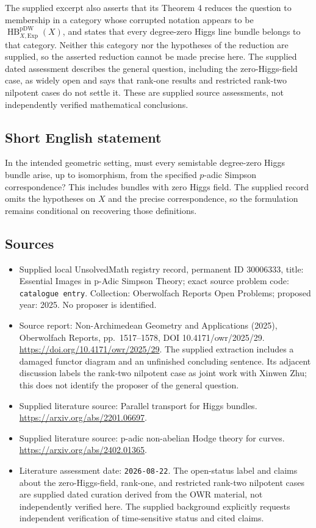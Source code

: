 \documentclass[11pt]{article}
\begin{document}
The supplied excerpt also asserts that its Theorem 4 reduces the question to membership in a category whose corrupted notation appears to be \(\operatorname{HB}^{\mathrm{pDW}}_{X,\mathrm{Exp}}(X)\), and states that every degree-zero Higgs line bundle belongs to that category. Neither this category nor the hypotheses of the reduction are supplied, so the asserted reduction cannot be made precise here. The supplied dated assessment describes the general question, including the zero-Higgs-field case, as widely open and says that rank-one results and restricted rank-two nilpotent cases do not settle it. These are supplied source assessments, not independently verified mathematical conclusions.
\subsection{Short English statement}
In the intended geometric setting, must every semistable degree-zero Higgs bundle arise, up to isomorphism, from the specified \(p\)-adic Simpson correspondence? This includes bundles with zero Higgs field. The supplied record omits the hypotheses on \(X\) and the precise correspondence, so the formulation remains conditional on recovering those definitions.
\subsection{Sources}
\begin{itemize}
\item Supplied local UnsolvedMath registry record, permanent ID \(30006333\), title: Essential Images in p-Adic Simpson Theory; exact source problem code: \texttt{catalogue entry}. Collection: Oberwolfach Reports Open Problems; proposed year: 2025. No proposer is identified.
\item Source report: Non-Archimedean Geometry and Applications (2025), Oberwolfach Reports, pp.\ 1517--1578, DOI 10.4171/owr/2025/29. \url{https://doi.org/10.4171/owr/2025/29}. The supplied extraction includes a damaged functor diagram and an unfinished concluding sentence. Its adjacent discussion labels the rank-two nilpotent case as joint work with Xinwen Zhu; this does not identify the proposer of the general question.
\item Supplied literature source: Parallel transport for Higgs bundles. \url{https://arxiv.org/abs/2201.06697}.
\item Supplied literature source: p-adic non-abelian Hodge theory for curves. \url{https://arxiv.org/abs/2402.01365}.
\item Literature assessment date: \texttt{2026-08-22}. The open-status label and claims about the zero-Higgs-field, rank-one, and restricted rank-two nilpotent cases are supplied dated curation derived from the OWR material, not independently verified here. The supplied background explicitly requests independent verification of time-sensitive status and cited claims.
\end{itemize}
\end{document}
